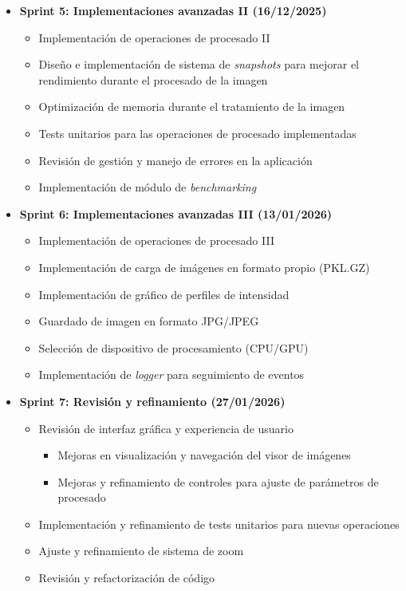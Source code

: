 \documentclass{article}
\begin{document}
\begin{itemize}
    \item \textbf{Sprint 5: Implementaciones avanzadas II (16/12/2025)}
    \begin{itemize}
        \item Implementación de operaciones de procesado II
        \item Diseño e implementación de sistema de \textit{snapshots} para mejorar
        el rendimiento durante el procesado de la imagen 
        \item Optimización de memoria durante el tratamiento de la imagen
        \item Tests unitarios para las operaciones de procesado implementadas 
        \item Revisión de gestión y manejo de errores en la aplicación
        \item Implementación de módulo de \textit{benchmarking}
    \end{itemize}
    \item \textbf{Sprint 6: Implementaciones avanzadas III (13/01/2026)}
    \begin{itemize}
        \item Implementación de operaciones de procesado III
        \item Implementación de carga de imágenes en formato propio (PKL.GZ)
        \item Implementación de gráfico de perfiles de intensidad
        \item Guardado de imagen en formato JPG/JPEG
        \item Selección de dispositivo de procesamiento (CPU/GPU)
        \item Implementación de \textit{logger} para seguimiento de eventos
    \end{itemize}
    \item \textbf{Sprint 7: Revisión y refinamiento (27/01/2026)}
    \begin{itemize}
        \item Revisión de interfaz gráfica y experiencia de usuario
        \begin{itemize}
            \item Mejoras en visualización y navegación del visor de imágenes
            \item Mejoras y refinamiento de controles para ajuste de parámetros de procesado
        \end{itemize}
        \item Implementación y refinamiento de tests unitarios para nuevas operaciones
        \item Ajuste y refinamiento de sistema de zoom
        \item Revisión y refactorización de código
    \end{itemize}
\end{itemize}
\end{document}
